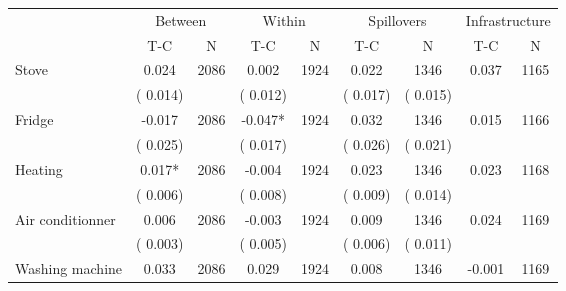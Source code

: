 
\begin{tabular}{l*{8}{c}}\hline&\multicolumn{2}{c}{Between}&\multicolumn{2}{c}{Within}&\multicolumn{2}{c}{Spillovers}&\multicolumn{2}{c}{Infrastructure}\\ \cmidrule(r){2-3}\cmidrule(l){4-5}\cmidrule(l){6-7}\cmidrule(l){8-9} & {T-C} & {N} & {T-C} & {N}  & {T-C}  & {N} & {T-C}  & {N} \\ \midrule
Stove        &              0.024      &       2086       &              0.002      &       1924       &              0.022      &       1346  &        0.037 &       1165       \\
                       &       (       0.014)            &                               &       (       0.012)            &                               &       (       0.017)            &       (       0.015) &                  \\
Fridge        &             -0.017      &       2086       &             -0.047*      &       1924       &              0.032      &       1346  &        0.015 &       1166       \\
                       &       (       0.025)            &                               &       (       0.017)            &                               &       (       0.026)            &       (       0.021) &                  \\
Heating        &              0.017*      &       2086       &             -0.004      &       1924       &              0.023      &       1346  &        0.023 &       1168       \\
                       &       (       0.006)            &                               &       (       0.008)            &                               &       (       0.009)            &       (       0.014) &                  \\
Air conditionner        &              0.006      &       2086       &             -0.003      &       1924       &              0.009      &       1346  &        0.024 &       1169       \\
                       &       (       0.003)            &                               &       (       0.005)            &                               &       (       0.006)            &       (       0.011) &                  \\
Washing machine        &              0.033      &       2086       &              0.029      &       1924       &              0.008      &       1346  &       -0.001 &       1169       \\

\end{tabular}
